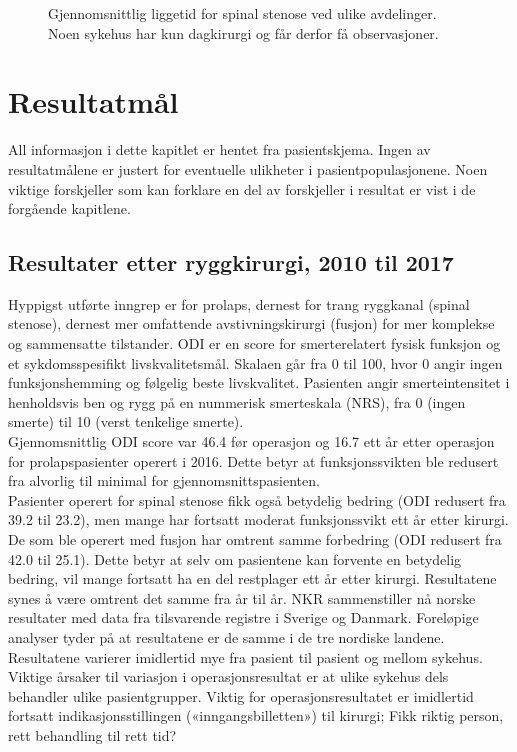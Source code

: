 \documentclass [norsk,a4paper,twoside]{article}\usepackage[]{graphicx}\usepackage[]{color}
\begin{document}
\begin{figure}[h] 
\caption{Gjennomsnittlig liggetid for spinal stenose ved ulike avdelinger. Noen sykehus har kun dagkirurgi og får derfor få observasjoner. } 
\label{fig:LiggetidAvdSS}
\end{figure}






\clearpage

\section{Resultatmål}
All informasjon i dette kapitlet er hentet fra pasientskjema. Ingen av resultatmålene er justert
for eventuelle ulikheter i pasientpopulasjonene. Noen viktige forskjeller som kan forklare en del av forskjeller i resultat er vist i de forgående kapitlene.





\subsection{ Resultater etter ryggkirurgi, 2010 til 2017}



Hyppigst utførte inngrep er for prolaps, dernest for trang ryggkanal (spinal stenose),
dernest mer omfattende avstivningskirurgi (fusjon) for mer komplekse og
sammensatte tilstander. 
ODI er en score for smerterelatert fysisk funksjon og et sykdomsspesifikt livskvalitetsmål. Skalaen går fra 0
til 100, hvor 0 angir ingen funksjonshemming og følgelig beste livskvalitet.
Pasienten angir smerteintensitet i henholdsvis ben og rygg på en nummerisk smerteskala (NRS), 
fra 0 (ingen smerte) til 10 (verst tenkelige smerte).
\\

Gjennomsnittlig ODI score var 46.4 før operasjon og 16.7 ett år etter
operasjon for prolapspasienter operert i 2016. Dette betyr at funksjonssvikten ble redusert 
fra alvorlig til minimal for gjennomsnittspasienten. \\

Pasienter operert for spinal stenose fikk også
betydelig bedring (ODI redusert fra 39.2 til 23.2), men mange har 
fortsatt moderat funksjonssvikt ett år etter kirurgi. 
De som ble operert med fusjon har
omtrent samme forbedring (ODI redusert fra 42.0 til 25.1). 
Dette betyr at selv om
pasientene kan forvente en betydelig bedring, vil mange fortsatt ha en del restplager
ett år etter kirurgi. Resultatene synes å være omtrent det samme fra år til år. NKR
sammenstiller nå norske resultater med data fra tilsvarende registre i Sverige og
Danmark. Foreløpige analyser tyder på at resultatene er de samme i
de tre nordiske landene.
Resultatene varierer imidlertid mye fra pasient til pasient og mellom sykehus.
Viktige årsaker til variasjon i operasjonsresultat er at ulike sykehus dels behandler
ulike pasientgrupper. Viktig for operasjonsresultatet er imidlertid fortsatt
indikasjonsstillingen («inngangsbilletten») til kirurgi; Fikk riktig person, rett
behandling til rett tid?
\end{document}
